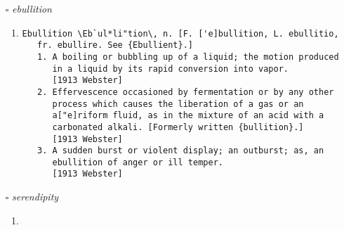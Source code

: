 \documentclass{article}
\begin{document}
\begin{itemize}
\begin{enumerate}
\item{
\begin{lstlisting}
Effervesce \Ef`fer*vesce"\, v. i. [imp. & p. p. {Effervesced};
   p. pr. & vb. n. {Effervescing}.] [L. effervescere; ex +
   fervescere to begin boiling, incho., fr. fervere to boil. See
   {Fervent}.]
   1. To be in a state of natural ebullition; to bubble and
      hiss, as fermenting liquors, or any fluid, when some part
      escapes in a gaseous form.
      [1913 Webster]
   2. To exhibit, in lively natural expression, feelings that
      can not be repressed or concealed; as, to effervesce with
      joy or merriment.
\end{lstlisting}}
\end{enumerate}
\item[$\square$] \emph{ ebullition }
\begin{enumerate}
\item{
\begin{lstlisting}
Ebullition \Eb`ul*li"tion\, n. [F. ['e]bullition, L. ebullitio,
   fr. ebullire. See {Ebullient}.]
   1. A boiling or bubbling up of a liquid; the motion produced
      in a liquid by its rapid conversion into vapor.
      [1913 Webster]
   2. Effervescence occasioned by fermentation or by any other
      process which causes the liberation of a gas or an
      a["e]riform fluid, as in the mixture of an acid with a
      carbonated alkali. [Formerly written {bullition}.]
      [1913 Webster]
   3. A sudden burst or violent display; an outburst; as, an
      ebullition of anger or ill temper.
      [1913 Webster]
\end{lstlisting}}
\end{enumerate}
\item[$\square$] \emph{ serendipity }
\begin{enumerate}
\item{
\begin{lstlisting}


\end{lstlisting}}
\end{enumerate}
\end{itemize}
\end{document}
